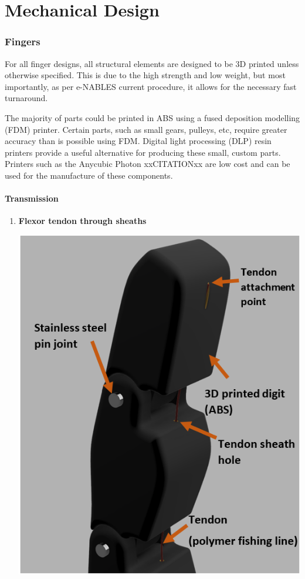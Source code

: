 \documentclass[12pt,3p]{report}
\begin{document}
\part{Mechanical Design}
\begin{multicols}{2}

	\section{Fingers}
For all finger designs, all structural elements are designed to be 3D printed unless otherwise specified. This is due to the high strength and low weight, but most importantly, as per e-NABLES current procedure, it allows for the necessary fast turnaround.

The majority of parts could be printed in ABS using a fused deposition modelling (FDM) printer. Certain parts, such as small gears, pulleys, etc, require greater accuracy than is possible using FDM. Digital light processing (DLP) resin printers provide a useful alternative for producing these small, custom parts. Printers such as the Anycubic Photon xxCITATIONxx are low cost and can be used for the manufacture of these components.
	
		\subsection{Transmission}
		
		
			\begin{enumerate}
			\item \textbf{Flexor tendon through sheaths} {

\includegraphics[scale=0.5]{tendon.PNG}
			
}
\end{enumerate}
\end{multicols}
\end{document}
